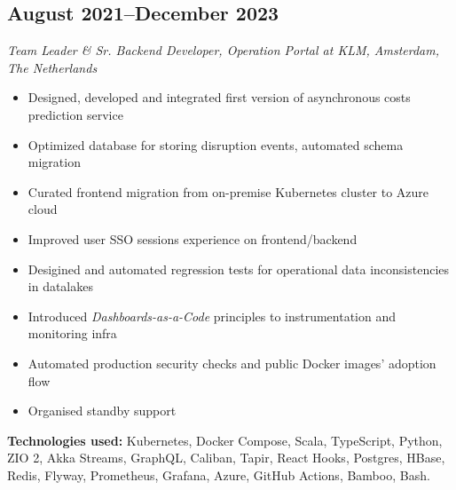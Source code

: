 \subsection*{August 2021--December 2023}

\textit{Team Leader \& Sr. Backend Developer, Operation Portal at KLM, Amsterdam, The Netherlands}

\begin{itemize}[noitemsep]
  \item Designed, developed and integrated first version of asynchronous costs prediction service
  \item Optimized database for storing disruption events, automated schema migration
  \item Curated frontend migration from on-premise Kubernetes cluster to Azure cloud
  \item Improved user SSO sessions experience on frontend/backend
  \item Desigined and automated regression tests for operational data inconsistencies in datalakes
  \item Introduced \textit{Dashboards-as-a-Code} principles to instrumentation and monitoring infra
  \item Automated production security checks and public Docker images' adoption flow
  \item Organised standby support
\end{itemize}

\textbf{Technologies used:}
Kubernetes, Docker Compose, Scala, TypeScript, Python, ZIO 2, Akka Streams, GraphQL, Caliban, Tapir,
React Hooks, Postgres, HBase, Redis, Flyway, Prometheus, Grafana, Azure, GitHub Actions, Bamboo, Bash.
